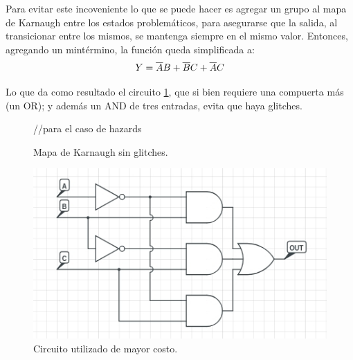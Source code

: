 \vspace{5mm}
Para evitar este incoveniente lo que se puede hacer es agregar un grupo al mapa de Karnaugh entre los estados problemáticos, 
para asegurarse que la salida, al transicionar entre los mismos, se mantenga siempre en el mismo valor.
Entonces, agregando un mintérmino, la función queda simplificada a:
\vspace{4mm}
\begin{equation}
    Y=\overline{A}B+\overline{B}C+\overline{A}C
    \vspace{5mm}
\end{equation}

Lo que da como resultado el circuito \ref{fig:circuito-sin-glitches}, que si bien requiere una compuerta más (un OR); y además un AND de tres entradas, evita que haya glitches.

\vspace{5mm}
\begin{figure}[H]
    \begin{minipage}{.49\linewidth}
        \begin{center}
        \vspace{10mm}
        \begin{Karnaughvuit}
                  //para el caso de hazards
        \end{Karnaughvuit}
        \label{table:mapaKarnaughSinGlitches}
        \caption{Mapa de Karnaugh sin glitches.}
    \end{center}
    \end{minipage}
    \begin{minipage}{.5\linewidth}
        \centering
        \includegraphics[width=.8\linewidth]{./circsinglitches.jpg}
        \caption{Circuito utilizado de mayor costo.}
        \label{fig:circuito-sin-glitches}
    \end{minipage}
\end{figure}



